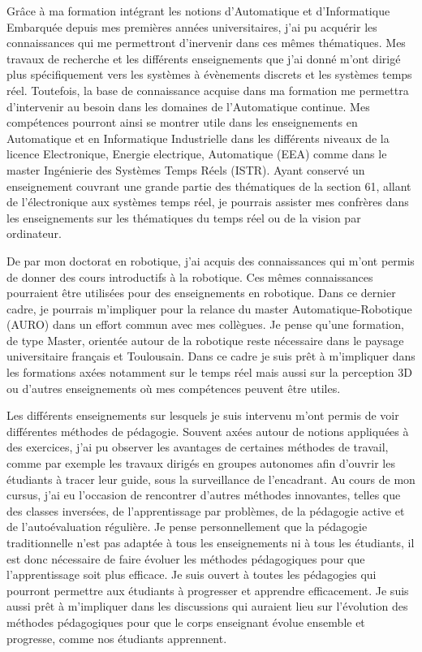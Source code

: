Grâce à ma formation intégrant les notions d'Automatique et d'Informatique Embarquée depuis mes premières années universitaires, j'ai pu acquérir les connaissances qui me permettront d'inervenir dans ces mêmes thématiques. Mes travaux de recherche et les différents enseignements que j'ai donné m'ont dirigé plus spécifiquement vers les systèmes à évènements discrets et les systèmes temps réel. Toutefois, la base de connaissance acquise dans ma formation me permettra d'intervenir au besoin dans les domaines de l'Automatique continue.
Mes compétences pourront ainsi se montrer utile dans les enseignements en Automatique et en Informatique Industrielle dans les différents niveaux de la licence Electronique, Energie electrique, Automatique (EEA) comme dans le master Ingénierie des Systèmes Temps Réels (ISTR).
Ayant conservé un enseignement couvrant une grande partie des thématiques de la section 61, allant de l'électronique aux systèmes temps réel, je pourrais assister mes confrères dans les enseignements sur les thématiques du temps réel ou de la vision par ordinateur.

De par mon doctorat en robotique, j'ai acquis des connaissances qui m'ont permis de donner des cours introductifs à la robotique. Ces mêmes connaissances pourraient être utilisées pour des enseignements en robotique. Dans ce dernier cadre, je pourrais m'impliquer pour la relance du master Automatique-Robotique (AURO) dans un effort commun avec mes collègues. Je pense qu'une formation, de type Master, orientée autour de la robotique reste nécessaire dans le paysage universitaire français et Toulousain. Dans ce cadre je suis prêt à m'impliquer dans les formations axées notamment sur le temps réel mais aussi sur la perception 3D ou d'autres enseignements où mes compétences peuvent être utiles.

Les différents enseignements sur lesquels je suis intervenu m'ont permis de voir différentes méthodes de pédagogie. Souvent axées autour de notions appliquées à des exercices, j'ai pu observer les avantages de certaines méthodes de travail, comme par exemple les travaux dirigés en groupes autonomes afin d'ouvrir les étudiants à tracer leur guide, sous la surveillance de l'encadrant. Au cours de mon cursus, j'ai eu l'occasion de rencontrer d'autres méthodes innovantes, telles que des classes inversées, de l'apprentissage par problèmes, de la pédagogie active et de l'autoévaluation régulière. Je pense personnellement que la pédagogie traditionnelle n'est pas adaptée à tous les enseignements ni à tous les étudiants, il est donc nécessaire de faire évoluer les méthodes pédagogiques pour que l'apprentissage soit plus efficace. Je suis ouvert à toutes les pédagogies qui pourront permettre aux étudiants à progresser et apprendre efficacement. Je suis aussi prêt à m'impliquer dans les discussions qui auraient lieu sur l'évolution des méthodes pédagogiques pour que le corps enseignant évolue ensemble et progresse, comme nos étudiants apprennent.

